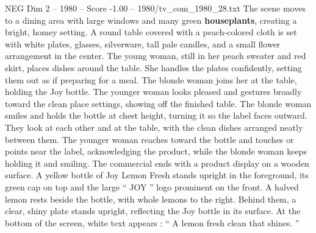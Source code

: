 \begin{textsample}{NEG Dim 2 – 1980 – Score -1.00 – 1980/tv\_com\_1980\_28.txt}
The scene moves to a dining area with large windows and many green \textbf{houseplants}, creating a bright, homey setting.
A round table covered with a peach-colored cloth is set with white plates, glasses, silverware, tall pale candles, and a small flower arrangement in the center.
The young woman, still in her peach sweater and red skirt, places dishes around the table.
She handles the plates confidently, setting them out as if preparing for a meal.
The blonde woman joins her at the table, holding the Joy bottle.
The younger woman looks pleased and gestures broadly toward the clean place settings, showing off the finished table.
The blonde woman smiles and holds the bottle at chest height, turning it so the label faces outward.
They look at each other and at the table, with the clean dishes arranged neatly between them.
The younger woman reaches toward the bottle and touches or points near the label, acknowledging the product, while the blonde woman keeps holding it and smiling.
The commercial ends with a product display on a wooden surface.
A yellow bottle of Joy Lemon Fresh stands upright in the foreground, its green cap on top and the large “ JOY ” logo prominent on the front.
A halved lemon rests beside the bottle, with whole lemons to the right.
Behind them, a clear, shiny plate stands upright, reflecting the Joy bottle in its surface.
At the bottom of the screen, white text appears : “ A lemon fresh clean that shines. ”

\end{textsample}
